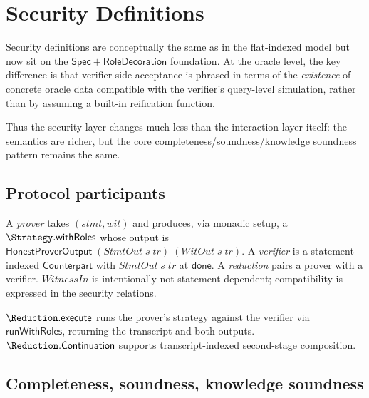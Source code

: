 
\section{Security Definitions}\label{sec:interaction-security}

Security definitions are conceptually the same as in the flat-indexed model but
now sit on the $\mathsf{Spec} + \mathsf{RoleDecoration}$ foundation.  At the
oracle level, the key difference is that verifier-side acceptance is phrased in
terms of the \emph{existence} of concrete oracle data compatible with the
verifier's query-level simulation, rather than by assuming a built-in
reification function.

Thus the security layer changes much less than the interaction layer itself:
the semantics are richer, but the core completeness/soundness/knowledge
soundness pattern remains the same.

\subsection{Protocol participants}

\begin{definition}
  \label{int:reduction}
  A \emph{prover} takes $(\mathit{stmt}, \mathit{wit})$ and produces, via
  monadic setup, a $\Strategy.\mathsf{withRoles}$ whose output is
  $\mathsf{HonestProverOutput}\;(\mathit{StmtOut}\;s\;\mathit{tr})\;
  (\mathit{WitOut}\;s\;\mathit{tr})$.
  A \emph{verifier} is a statement-indexed $\mathsf{Counterpart}$ with
  $\mathit{StmtOut}\;s\;\mathit{tr}$ at $\mathsf{done}$.
  A \emph{reduction} pairs a prover with a verifier.
  $\mathit{WitnessIn}$ is intentionally not statement-dependent; compatibility
  is expressed in the security relations.
\end{definition}

$\Reduction.\mathsf{execute}$ runs the prover's strategy against the verifier
via $\mathsf{runWithRoles}$, returning the transcript and both outputs.
$\Reduction.\mathsf{Continuation}$ supports transcript-indexed second-stage
composition.

\subsection{Completeness, soundness, knowledge soundness}

